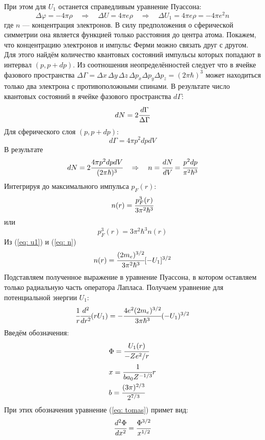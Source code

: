 \documentclass[a4paper,14pt]{extarticle} %
\begin{document}
	При этом для \(U_1\) останется справедливым уравнение Пуассона:
	\begin{equation}
		\Delta \varphi = - 4\pi \rho
		\quad \Rightarrow \quad
		\Delta U = 4 \pi e \rho
		\quad \Rightarrow \quad
		\Delta U_1 = 4 \pi e \rho = - 4\pi e^2 n
	\end{equation}
	где \(n\) --- концентрация электронов. В силу предположения о сферической симметрии она является функцией только расстояния до центра атома.
	Покажем, что концентрацию электронов и импульс Ферми можно связать друг с другом. Для этого найдём количество квантовых состояний импульсы которых попадают в интервал \((p, p+dp)\). 
	Из соотношения неопределённостей следует что в ячейке фазового пространства \(\Delta \Gamma = \Delta x\,\Delta y\,\Delta z\,\Delta p_x\Delta p_y\Delta p_z = (2\pi\hbar)^3\) может находиться только два электрона с противоположными спинами. В результате число квантовых состояний в ячейке фазового пространства \(d\Gamma\):
	\[
	dN = 2 \cfrac{d\Gamma}{\Delta \Gamma}
	\]
	Для сферического слоя \((p, p+dp)\):
	\[
	d\Gamma = 4\pi p^2 dp dV
	\]
	В результате
	\[
	dN = 2 \cfrac{4\pi p^2 dp dV}{(2\pi\hbar)^3}
	\quad \Rightarrow \quad
	n = \cfrac{dN}{dV} = \cfrac{p^2 dp}{\pi^2\hbar^3}
	\]
	Интегрируя до максимального импульса \(p_F(r)\):
	\begin{equation*}
	n(r) = \cfrac{p_F^3(r)}{3\pi^2\hbar^3}
	\end{equation*}
	или
	\begin{equation}\label{eq: n}
	p_F^3(r) = 3\pi^2\hbar^3 n(r)
	\end{equation}	
	Из (\ref{eq: u1}) и (\ref{eq: n})
	\begin{equation*}
	n(r) =  \cfrac{(2m_e)^{3/2}}{3\pi^2\hbar^3} [-U_1]^{3/2}
	\end{equation*}
	Подставляем полученное выражение в уравнение Пуассона, в котором оставляем только радиальную часть оператора Лапласа. Получаем уравнение для потенциальной энергии \(U_1\):
	\begin{equation}\label{eq: tomas}
	\cfrac{1}{r} \cfrac{d^2}{dr^2}(rU_1) =
	- \cfrac{4 e^2(2m_e)^{3/2}}{3\pi\hbar^3} (-U_1)^{3/2}
	\end{equation}
	Введём обозначения:
	\begin{equation}\label{eq: norma}
	\begin{split}
		& \Phi = \cfrac{U_1(r)}{-Ze^2/r} \\
		& x = \cfrac{1}{ba_0Z^{-1/3}} r \\
		& b = \cfrac{(3\pi)^{2/3}}{2^{7/3}}
	\end{split}
	\end{equation}
	При этих обозначения уравнение (\ref{eq: tomas}) примет вид:
	\begin{equation}\label{eq: tomas2}
	\cfrac{d^2\Phi}{dx^2} = \cfrac{\Phi^{3/2}}{x^{1/2}}
	\end{equation}
	
\end{document}
